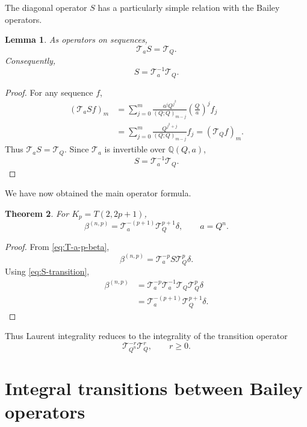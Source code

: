 \documentclass[11pt]{amsart}
\newtheorem{theorem}{Theorem}[section]
\newtheorem{lemma}[theorem]{Lemma}
\begin{document}
The diagonal operator \(S\) has a particularly simple relation with
the Bailey operators.

\begin{lemma}\label{lem:TAS}
As operators on sequences,
\begin{equation}\label{eq:TAS}
\mathcal T_aS
=
\mathcal T_Q.
\end{equation}
Consequently,
\begin{equation}\label{eq:S-transition}
S
=
\mathcal T_a^{-1}\mathcal T_Q.
\end{equation}
\end{lemma}
\begin{proof}
For any sequence \(f\),
\begin{align*}
(\mathcal T_aSf)_m
&=
\sum_{j=0}^{m}
\frac{a^jQ^{j^2}}{(Q;Q)_{m-j}}
\left(\frac Qa\right)^j f_j \\
&=
\sum_{j=0}^{m}
\frac{Q^{j^2+j}}{(Q;Q)_{m-j}}f_j
=
(\mathcal T_Qf)_m.
\end{align*}
Thus \(\mathcal T_aS=\mathcal T_Q\).  Since
\(\mathcal T_a\) is invertible over \(\mathbb Q(Q,a)\),
\[
S=\mathcal T_a^{-1}\mathcal T_Q.
\]
\end{proof}

We have now obtained the main operator formula.

\begin{theorem}\label{thm:beta-transition}
For \(K_p=T(2,2p+1)\),
\begin{equation}\label{eq:beta-transition}
\beta^{(n,p)}
=
\mathcal T_a^{-(p+1)}
\mathcal T_Q^{p+1}\delta,
\qquad
a=Q^n.
\end{equation}
\end{theorem}

\begin{proof}
From \eqref{eq:T-a-p-beta},
\[
\beta^{(n,p)}
=
\mathcal T_a^{-p}
S\mathcal T_Q^p\delta.
\]
Using \eqref{eq:S-transition},
\begin{align*}
\beta^{(n,p)}
&=
\mathcal T_a^{-p}
\mathcal T_a^{-1}
\mathcal T_Q
\mathcal T_Q^p\delta
\\
&=
\mathcal T_a^{-(p+1)}
\mathcal T_Q^{p+1}\delta.
\end{align*}
\end{proof}

Thus Laurent integrality reduces to the integrality of the transition
operator
\[
\mathcal T_{Q^n}^{-r}\mathcal T_Q^r,
\qquad r\geq0.
\]


\section{Integral transitions between Bailey operators}
\label{sec:integrality}
\end{document}
